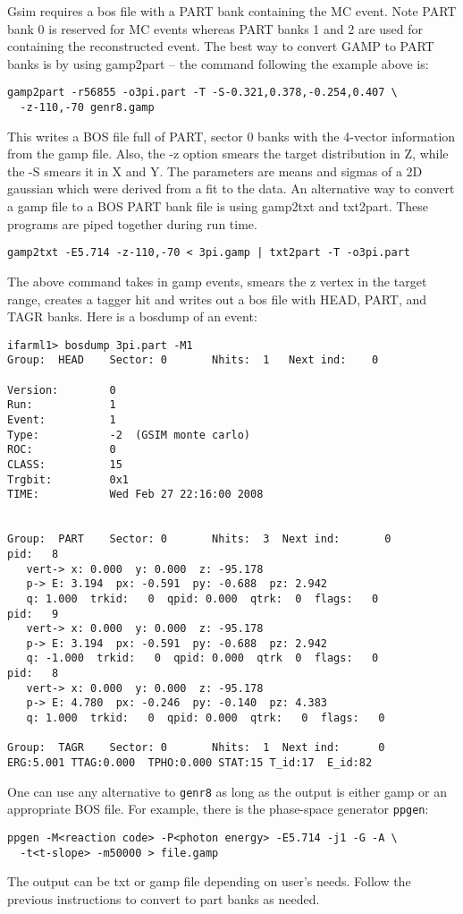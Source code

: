 Gsim requires a bos file with a PART bank containing the MC event. Note PART bank 0 is reserved for MC events whereas PART banks 1 and 2 are used for containing the reconstructed event. The best way to convert GAMP to PART banks is by using gamp2part -- the command following the example above is:
\begin{verbatim}
gamp2part -r56855 -o3pi.part -T -S-0.321,0.378,-0.254,0.407 \
  -z-110,-70 genr8.gamp
\end{verbatim}
This writes a BOS file full of PART, sector 0 banks with the 4-vector information from the gamp file. Also, the -z option smears the target distribution in Z, while the -S smears it in X and Y. The parameters are means and sigmas of a 2D gaussian which were derived from a fit to the data. An alternative way to convert a gamp file to a BOS PART bank file is using gamp2txt and txt2part. These programs are piped together during run time.
\begin{verbatim}
gamp2txt -E5.714 -z-110,-70 < 3pi.gamp | txt2part -T -o3pi.part
\end{verbatim}
The above command takes in gamp events, smears the z vertex in the target range, creates a tagger hit and writes out a bos file with HEAD, PART, and TAGR banks. Here is a bosdump of an event:
\begin{verbatim}
ifarml1> bosdump 3pi.part -M1
Group:  HEAD    Sector: 0       Nhits:  1   Next ind:    0

Version:        0
Run:            1
Event:          1
Type:           -2  (GSIM monte carlo)
ROC:            0
CLASS:          15
Trgbit:         0x1
TIME:           Wed Feb 27 22:16:00 2008


Group:  PART    Sector: 0       Nhits:  3  Next ind:       0
pid:   8
   vert-> x: 0.000  y: 0.000  z: -95.178
   p-> E: 3.194  px: -0.591  py: -0.688  pz: 2.942
   q: 1.000  trkid:   0  qpid: 0.000  qtrk:  0  flags:   0
pid:   9
   vert-> x: 0.000  y: 0.000  z: -95.178
   p-> E: 3.194  px: -0.591  py: -0.688  pz: 2.942
   q: -1.000  trkid:   0  qpid: 0.000  qtrk  0  flags:   0
pid:   8
   vert-> x: 0.000  y: 0.000  z: -95.178
   p-> E: 4.780  px: -0.246  py: -0.140  pz: 4.383
   q: 1.000  trkid:   0  qpid: 0.000  qtrk:   0  flags:   0

Group:  TAGR    Sector: 0       Nhits:  1  Next ind:      0
ERG:5.001 TTAG:0.000  TPHO:0.000 STAT:15 T_id:17  E_id:82
\end{verbatim}

One can use any alternative to \texttt{genr8} as long as the output is either gamp or an appropriate BOS file. For example, there is the phase-space generator \texttt{ppgen}:
\begin{verbatim}
ppgen -M<reaction code> -P<photon energy> -E5.714 -j1 -G -A \
  -t<t-slope> -m50000 > file.gamp
\end{verbatim}
The output can be txt or gamp file depending on user's needs. Follow the previous instructions to convert to part banks as needed.

